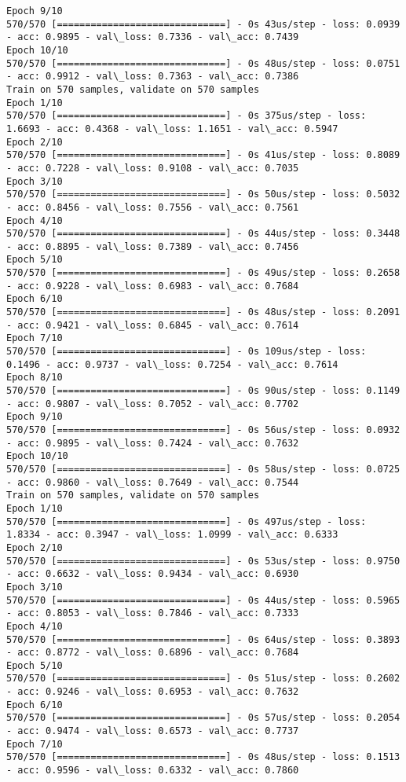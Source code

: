 \documentclass[11pt]{article}
\begin{document}
\begin{Verbatim}[commandchars=\\\{\}]
Epoch 9/10
570/570 [==============================] - 0s 43us/step - loss: 0.0939 - acc: 0.9895 - val\_loss: 0.7336 - val\_acc: 0.7439
Epoch 10/10
570/570 [==============================] - 0s 48us/step - loss: 0.0751 - acc: 0.9912 - val\_loss: 0.7363 - val\_acc: 0.7386
Train on 570 samples, validate on 570 samples
Epoch 1/10
570/570 [==============================] - 0s 375us/step - loss: 1.6693 - acc: 0.4368 - val\_loss: 1.1651 - val\_acc: 0.5947
Epoch 2/10
570/570 [==============================] - 0s 41us/step - loss: 0.8089 - acc: 0.7228 - val\_loss: 0.9108 - val\_acc: 0.7035
Epoch 3/10
570/570 [==============================] - 0s 50us/step - loss: 0.5032 - acc: 0.8456 - val\_loss: 0.7556 - val\_acc: 0.7561
Epoch 4/10
570/570 [==============================] - 0s 44us/step - loss: 0.3448 - acc: 0.8895 - val\_loss: 0.7389 - val\_acc: 0.7456
Epoch 5/10
570/570 [==============================] - 0s 49us/step - loss: 0.2658 - acc: 0.9228 - val\_loss: 0.6983 - val\_acc: 0.7684
Epoch 6/10
570/570 [==============================] - 0s 48us/step - loss: 0.2091 - acc: 0.9421 - val\_loss: 0.6845 - val\_acc: 0.7614
Epoch 7/10
570/570 [==============================] - 0s 109us/step - loss: 0.1496 - acc: 0.9737 - val\_loss: 0.7254 - val\_acc: 0.7614
Epoch 8/10
570/570 [==============================] - 0s 90us/step - loss: 0.1149 - acc: 0.9807 - val\_loss: 0.7052 - val\_acc: 0.7702
Epoch 9/10
570/570 [==============================] - 0s 56us/step - loss: 0.0932 - acc: 0.9895 - val\_loss: 0.7424 - val\_acc: 0.7632
Epoch 10/10
570/570 [==============================] - 0s 58us/step - loss: 0.0725 - acc: 0.9860 - val\_loss: 0.7649 - val\_acc: 0.7544
Train on 570 samples, validate on 570 samples
Epoch 1/10
570/570 [==============================] - 0s 497us/step - loss: 1.8334 - acc: 0.3947 - val\_loss: 1.0999 - val\_acc: 0.6333
Epoch 2/10
570/570 [==============================] - 0s 53us/step - loss: 0.9750 - acc: 0.6632 - val\_loss: 0.9434 - val\_acc: 0.6930
Epoch 3/10
570/570 [==============================] - 0s 44us/step - loss: 0.5965 - acc: 0.8053 - val\_loss: 0.7846 - val\_acc: 0.7333
Epoch 4/10
570/570 [==============================] - 0s 64us/step - loss: 0.3893 - acc: 0.8772 - val\_loss: 0.6896 - val\_acc: 0.7684
Epoch 5/10
570/570 [==============================] - 0s 51us/step - loss: 0.2602 - acc: 0.9246 - val\_loss: 0.6953 - val\_acc: 0.7632
Epoch 6/10
570/570 [==============================] - 0s 57us/step - loss: 0.2054 - acc: 0.9474 - val\_loss: 0.6573 - val\_acc: 0.7737
Epoch 7/10
570/570 [==============================] - 0s 48us/step - loss: 0.1513 - acc: 0.9596 - val\_loss: 0.6332 - val\_acc: 0.7860

\end{Verbatim}
\end{document}
